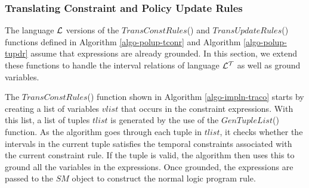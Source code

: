 \documentclass[11pt]{report}
\begin{document}
        \subsubsection{Translating Constraint and Policy Update Rules}

          The language ${\cal L}$ versions of the $TransConstRules$() and
          $TransUpdateRules$() functions defined in Algorithm
          \ref{algo-polup-tconr} and Algorithm \ref{algo-polup-tupdr} assume
          that expressions are already grounded. In this section, we extend
          these functions to handle the interval relations of language
          ${\cal L^T}$ as well as ground variables.

          The $TransConstRules$() function shown in Algorithm
          \ref{algo-impln-traco} starts by creating a list of variables
          $vlist$ that occurs in the constraint expressions. With this list,
          a list of tuples $tlist$ is generated by the use of the
          $GenTupleList$() function. As the algorithm goes through each tuple
          in $tlist$, it checks whether the intervals in the current tuple
          satisfies the temporal constraints associated with the current
          constraint rule. If the tuple is valid, the algorithm then uses
          this to ground all the variables in the expressions. Once grounded,
          the expressions are passed to the $SM$ object to construct the
          normal logic program rule.
\end{document}
